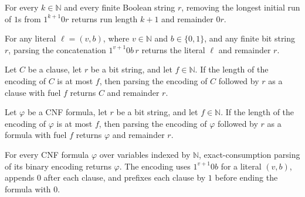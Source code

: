 \begin{theorem}
\label{Std.Sat.CNF.takeTrues_replicate}
\leanok
{}
For every $k\in\mathbb{N}$ and every finite Boolean string $r$, removing the longest
initial run of $1$s from $1^{k+1}0r$ returns run length $k+1$ and remainder $0r$.
\end{theorem}

\begin{theorem}
\label{Std.Sat.CNF.parseLit_serializeLit}
\leanok
{}
For any literal $\ell=(v,b)$, where $v\in\mathbb N$ and $b\in\{0,1\}$, and any finite
bit string $r$, parsing the concatenation $1^{v+1}0b\,r$ returns the literal $\ell$ and
remainder $r$.
\end{theorem}

\begin{theorem}
\label{Std.Sat.CNF.parseClause_serializeClause}
\leanok
{}
Let $C$ be a clause, let $r$ be a bit string, and let $f\in\mathbb{N}$. If the length of
the encoding of $C$ is at most $f$, then parsing the encoding of $C$ followed by $r$ as
a clause with fuel $f$ returns $C$ and remainder $r$.
\end{theorem}

\begin{theorem}
\label{Std.Sat.CNF.parseClauses_serialize}
\leanok
{}
Let $\varphi$ be a CNF formula, let $r$ be a bit string, and let $f\in\mathbb{N}$. If
the length of the encoding of $\varphi$ is at most $f$, then parsing the encoding of
$\varphi$ followed by $r$ as a formula with fuel $f$ returns $\varphi$ and remainder
$r$.
\end{theorem}

\begin{theorem}
\label{Std.Sat.CNF.parse_serialize}
\leanok
{}
For every CNF formula $\varphi$ over variables indexed by $\mathbb N$, exact-consumption
parsing of its binary encoding returns $\varphi$. The encoding uses $1^{v+1}0b$ for a
literal $(v,b)$, appends $0$ after each clause, and prefixes each clause by $1$ before
ending the formula with $0$.
\end{theorem}

